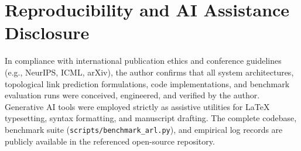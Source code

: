 \documentclass[10pt,twocolumn,letterpaper]{article}
\begin{document}
\section*{Reproducibility and AI Assistance Disclosure}
In compliance with international publication ethics and conference guidelines (e.g., NeurIPS, ICML, arXiv), the author confirms that all system architectures, topological link prediction formulations, code implementations, and benchmark evaluation runs were conceived, engineered, and verified by the author. Generative AI tools were employed strictly as assistive utilities for LaTeX typesetting, syntax formatting, and manuscript drafting. The complete codebase, benchmark suite (\texttt{scripts/benchmark\_arl.py}), and empirical log records are publicly available in the referenced open-source repository.



\end{document}
